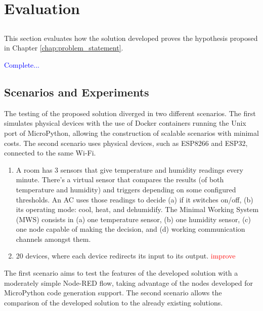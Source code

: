 \chapter{Evaluation} \label{chap:evaluation} \minitoc

\section*{}

This section evaluates how the solution developed proves the hypothesis proposed in Chapter \ref{chap:problem_statement}.

\textcolor{blue}{Complete...}


\section{Scenarios and Experiments}\label{sec:scenarios_experiments}

The testing of the proposed solution diverged in two different scenarios. The first simulates physical devices with the use of Docker containers running the Unix port of MicroPython, allowing the construction of scalable scenarios with minimal costs. The second scenario uses physical devices, such as ESP8266 and ESP32, connected to the same Wi-Fi.

\begin{enumerate}
    \item A room has 3 sensors that give temperature and humidity readings every minute. There’s a virtual sensor that compares the results (of both temperature and humidity) and triggers depending on some configured thresholds. An AC uses those readings to decide (a) if it switches on/off, (b) its operating mode: cool, heat, and dehumidify. The Minimal Working System (MWS) consists in (a) one temperature sensor, (b) one humidity sensor, (c) one node capable of making the decision, and (d) working communication channels amongst them.
    \item 20 devices, where each device redirects its input to its output. \textcolor{red}{improve}
\end{enumerate}

The first scenario aims to test the features of the developed solution with a moderately simple Node-RED flow, taking advantage of the nodes developed for MicroPython code generation support. The second scenario allows the comparison of the developed solution to the already existing solutions.

